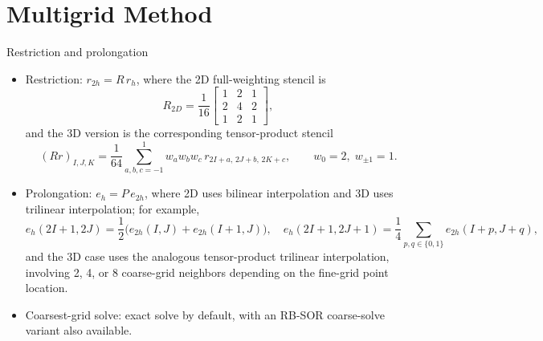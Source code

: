 \documentclass[aspectratio=169]{beamer}
\newcommand{\frametitlesub}[2]{#2}
\begin{document}
\section{Multigrid Method}
\begin{frame}[t]{\frametitlesub{Transfer operators and cycles}{Restriction and prolongation}}
    \footnotesize
    \begin{itemize}
        \item Restriction: \(r_{2h} = R\,r_h\), where the 2D full-weighting stencil is
              \[
                  R_{2D} = \frac{1}{16}
                  \begin{bmatrix}
                      1 & 2 & 1 \\
                      2 & 4 & 2 \\
                      1 & 2 & 1
                  \end{bmatrix},
              \]
              and the 3D version is the corresponding tensor-product stencil
              \[
                  (Rr)_{I,J,K} = \frac{1}{64}\sum_{a,b,c=-1}^{1} w_a w_b w_c\, r_{2I+a,\,2J+b,\,2K+c},
                  \qquad w_0 = 2,\; w_{\pm1} = 1.
              \]
        \item Prolongation: \(e_h = P\,e_{2h}\), where 2D uses bilinear interpolation and 3D uses trilinear interpolation; for example,
              \[
                  e_h(2I+1, 2J) = \frac{1}{2}\bigl(e_{2h}(I, J) + e_{2h}(I+1, J)\bigr),
                  \quad
                  e_h(2I+1, 2J+1) = \frac{1}{4}\sum_{p,q \in \{0,1\}} e_{2h}(I+p, J+q),
              \]
              and the 3D case uses the analogous tensor-product trilinear interpolation, involving 2, 4, or 8 coarse-grid neighbors depending on the fine-grid point location.
        \item Coarsest-grid solve: exact solve by default, with an RB-SOR coarse-solve variant also available.
    \end{itemize}
\end{frame}
\end{document}
